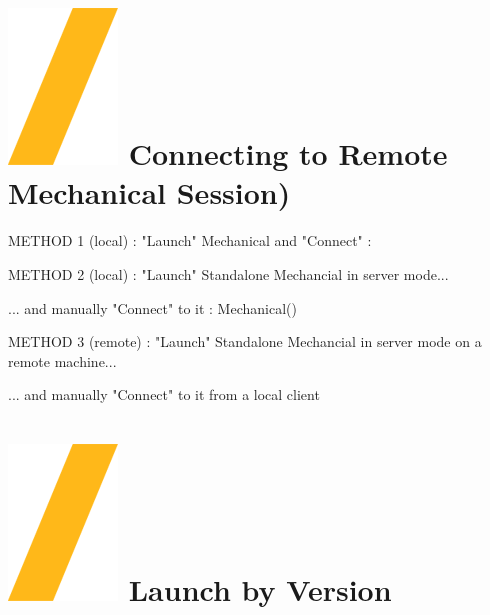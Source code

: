 \documentclass[9pt,landscape]{article}
\begin{document}
\begin{multicols}{3}
\setlength{\premulticols}{1pt}
\setlength{\postmulticols}{1pt}
\setlength{\multicolsep}{1pt}
\setlength{\columnsep}{2pt}

\vfill
\section{\includegraphics[height=\fontcharht\font`\S]{slash.png} Connecting to Remote Mechanical Session)}
METHOD 1 (local) :
"Launch" Mechanical and "Connect" :


METHOD 2 (local) :
"Launch" Standalone Mechancial in server mode...


... and manually "Connect" to it : Mechanical()


METHOD 3 (remote) :
"Launch" Standalone Mechancial in server mode on a remote machine...


... and manually "Connect" to it from a local client



\section{\includegraphics[height=\fontcharht\font`\S]{slash.png} Launch by Version}


\end{multicols}
\end{document}
